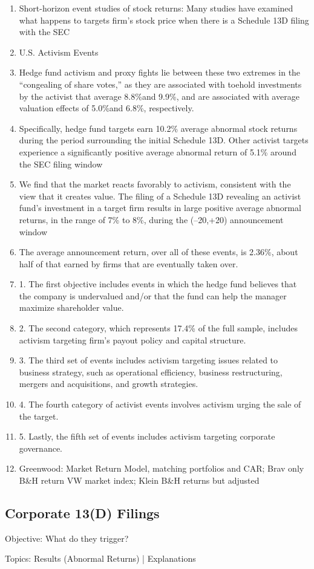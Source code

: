 \documentclass[12pt]{article}
\begin{document}
	\begin{enumerate}
		\item Short-horizon event studies of stock returns: Many studies have examined what happens to targets firm’s stock price when there is a Schedule 13D filing with the SEC \citep{CoffeeJr.2014}

		\item U.S. Activism Events 

		\item Hedge fund activism and proxy fights lie between these two extremes in the “congealing of share votes,” as they are associated with toehold investments by the activist that average 8.8\%and 9.9\%, and are associated with average valuation effects of 5.0\%and 6.8\%, respectively.\citep{Denes2017}

		\item Specifically, hedge fund targets earn 10.2\% average abnormal stock returns during the period surrounding the initial Schedule 13D. Other activist targets experience a significantly positive average abnormal return of 5.1\% around the SEC filing window \citep{Klein2009}

		\item We find that the market reacts favorably to activism, consistent with the view that it creates value. The filing of a Schedule 13D revealing an activist fund’s investment in a target firm results in large positive average abnormal returns, in the range of 7\% to 8\%, during the (–20,+20) announcement window \citep{Brav2008}

		\item The average announcement return, over all of these events, is 2.36\%, about half of that earned by firms that are eventually taken over. \citep{Greenwood2009}

	
		\item  1. The first objective includes events in which the hedge fund believes that the company is undervalued and/or that the fund can help the manager maximize shareholder value.

        \item 2. The second category, which represents 17.4\% of the full sample, includes activism targeting firm’s payout policy and capital structure.

        \item 3. The third set of events includes activism targeting issues related to business strategy, such as operational efficiency, business restructuring, mergers and acquisitions, and growth strategies.

        \item 4. The fourth category of activist events involves activism urging the sale of the target.

		\item 5. Lastly, the fifth set of events includes activism targeting corporate governance.
		
		\item Greenwood: Market Return Model, matching portfolios and CAR; Brav only B\&H return VW market index; Klein B\&H returns but adjusted 
	\end{enumerate}

\subsection{Corporate 13(D) Filings}
\begin{center}
	Objective: What do they trigger? 
\end{center}
Topics: Results (Abnormal Returns) | Explanations 
\end{document}
